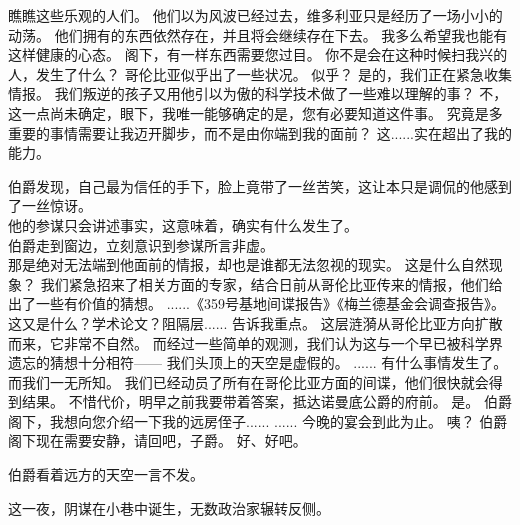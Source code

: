 \documentclass[openany]{book}
\begin{document}
\begin{dialogue}
     瞧瞧这些乐观的人们。
     他们以为风波已经过去，维多利亚只是经历了一场小小的动荡。
     他们拥有的东西依然存在，并且将会继续存在下去。
     我多么希望我也能有这样健康的心态。
     阁下，有一样东西需要您过目。
     你不是会在这种时候扫我兴的人，发生了什么？
     哥伦比亚似乎出了一些状况。
     似乎？
     是的，我们正在紧急收集情报。
     我们叛逆的孩子又用他引以为傲的科学技术做了一些难以理解的事？
     不，这一点尚未确定，眼下，我唯一能够确定的是，您有必要知道这件事。
     究竟是多重要的事情需要让我迈开脚步，而不是由你端到我的面前？
     这......实在超出了我的能力。\par
    伯爵发现，自己最为信任的手下，脸上竟带了一丝苦笑，这让本只是调侃的他感到了一丝惊讶。\\
    他的参谋只会讲述事实，这意味着，确实有什么发生了。\\
    伯爵走到窗边，立刻意识到参谋所言非虚。\\
    那是绝对无法端到他面前的情报，却也是谁都无法忽视的现实。
     这是什么自然现象？
     我们紧急招来了相关方面的专家，结合日前从哥伦比亚传来的情报，他们给出了一些有价值的猜想。
     ......《359号基地间谍报告》《梅兰德基金会调查报告》。
     这又是什么？学术论文？阻隔层......
     告诉我重点。
     这层涟漪从哥伦比亚方向扩散而来，它非常不自然。
     而经过一些简单的观测，我们认为这与一个早已被科学界遗忘的猜想十分相符——
     我们头顶上的天空是虚假的。
     ......
     有什么事情发生了。
     而我们一无所知。
     我们已经动员了所有在哥伦比亚方面的间谍，他们很快就会得到结果。
     不惜代价，明早之前我要带着答案，抵达诺曼底公爵的府前。
     是。
     伯爵阁下，我想向您介绍一下我的远房侄子......
     ......
     今晚的宴会到此为止。
     咦？
     伯爵阁下现在需要安静，请回吧，子爵。
     好、好吧。\par
    伯爵看着远方的天空一言不发。\par
    这一夜，阴谋在小巷中诞生，无数政治家辗转反侧。
\end{dialogue}
\end{document}
